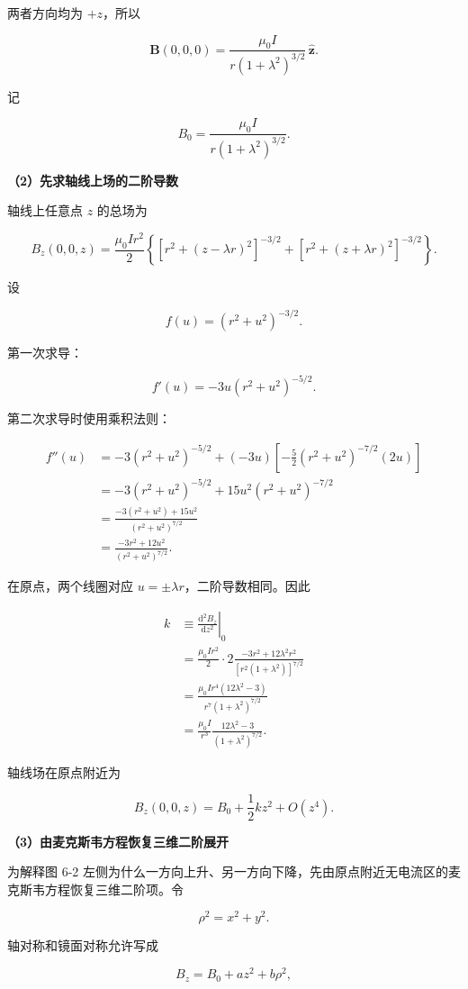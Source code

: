\documentclass[12pt,a4paper,UTF8]{ctexart}
\begin{document}
两者方向均为 \(+z\)，所以

\[
\boxed{
\bm B(0,0,0)
=\frac{\mu_0I}{r(1+\lambda^2)^{3/2}}\,\hat{\bm z}
}.
\]

记

\[
B_0=\frac{\mu_0I}{r(1+\lambda^2)^{3/2}}.
\]

\textbf{（2）先求轴线上场的二阶导数}

轴线上任意点 \(z\) 的总场为

\[
B_z(0,0,z)=\frac{\mu_0Ir^2}{2}
\left\{
[r^2+(z-\lambda r)^2]^{-3/2}
+[r^2+(z+\lambda r)^2]^{-3/2}
\right\}.
\]

设

\[f(u)=(r^2+u^2)^{-3/2}.\]

第一次求导：

\[
f'(u)=-3u(r^2+u^2)^{-5/2}.
\]

第二次求导时使用乘积法则：

\[
\begin{aligned}
f''(u)
&=-3(r^2+u^2)^{-5/2}
+(-3u)\left[-\frac52(r^2+u^2)^{-7/2}(2u)\right]\\
&=-3(r^2+u^2)^{-5/2}
+15u^2(r^2+u^2)^{-7/2}\\
&=\frac{-3(r^2+u^2)+15u^2}{(r^2+u^2)^{7/2}}\\
&=\frac{-3r^2+12u^2}{(r^2+u^2)^{7/2}}.
\end{aligned}
\]

在原点，两个线圈对应 \(u=\pm\lambda r\)，二阶导数相同。因此

\[
\begin{aligned}
k
&\equiv\left.\frac{\mathrm{d}^2B_z}{\mathrm{d}z^2}\right|_0\\
&=\frac{\mu_0Ir^2}{2}\cdot2
\frac{-3r^2+12\lambda^2r^2}
{[r^2(1+\lambda^2)]^{7/2}}\\
&=\frac{\mu_0Ir^4(12\lambda^2-3)}
{r^7(1+\lambda^2)^{7/2}}\\
&=\boxed{
\frac{\mu_0I}{r^3}
\frac{12\lambda^2-3}{(1+\lambda^2)^{7/2}}
}.
\end{aligned}
\]

轴线场在原点附近为

\[
B_z(0,0,z)=B_0+\frac12kz^2+O(z^4).
\]

\textbf{（3）由麦克斯韦方程恢复三维二阶展开}

为解释图 6-2
左侧为什么一方向上升、另一方向下降，先由原点附近无电流区的麦克斯韦方程恢复三维二阶项。令

\[\rho^2=x^2+y^2.\]

轴对称和镜面对称允许写成

\[
B_z=B_0+az^2+b\rho^2,
\]
\end{document}
